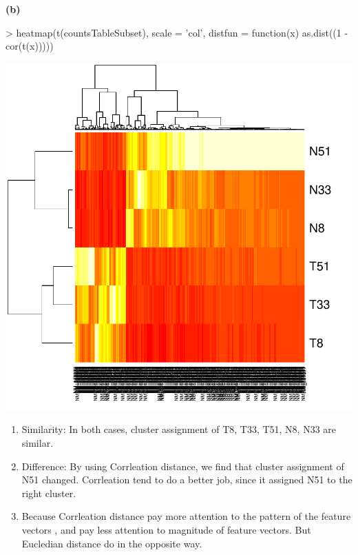 \documentclass[a4paper]{article}
\renewcommand{\part}[1] {\vspace{.10in} {\bf (#1)}}
\begin{document}
\part{b}
\begin{Schunk}
\begin{Sinput}
> heatmap(t(countsTableSubset), scale = 'col', distfun = function(x) as.dist((1 - cor(t(x)))))
\end{Sinput}
\end{Schunk}
\includegraphics{pca-2b}
{\color{red}
\begin{enumerate}
\item Similarity: In both cases, cluster assignment of T8, T33, T51, N8, N33 are similar.
\item Difference: By using Corrleation distance, we find that cluster assignment of N51 changed. Corrleation tend to do a better job, since it assigned N51 to the right cluster.
\item Because Corrleation distance pay more attention to the pattern of the feature vectors , and pay less attention to magnitude of feature vectors. But Eucledian distance do in the opposite way.
\end{enumerate}
}
\end{document}
